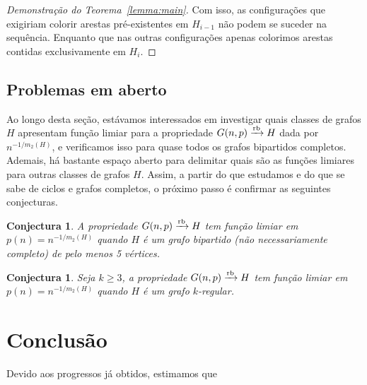 \documentclass[11pt,twoside,a4paper]{book}
\newcommand{\K}{K_{\ell,r}} %
\def\rbarrow{\xrightarrow[]{\raisebox{0.0mm}[0mm]{$\scriptstyle \rm rb$}}}
\newtheorem{conjectura}[teorema] {Conjectura}
\theoremstyle{note}
\begin{document}
\begin{proof}[Demonstração do Teorema~\ref{lemma:main}]
 
        Com isso, as configurações que exigiriam colorir arestas pré-existentes em $H_{i-1}$ não podem se suceder na sequência.
        Enquanto que nas outras configurações apenas colorimos arestas contidas exclusivamente em $H_{i}$.
     \end{proof}
 
  
  
\subsection{Problemas em aberto}
\label{subsec:bipartido-prob}
Ao longo desta seção, estávamos interessados em investigar quais classes de grafos $H$ apresentam função limiar para a propriedade $G(n,p)\rbarrow H$  dada por $n^{-1/m_2(H)}$, 
e verificamos isso para quase todos os grafos bipartidos completos.
Ademais, há bastante espaço aberto para delimitar quais são as funções limiares para outras classes de grafos $H$. 
Assim, a partir do que estudamos e do que se sabe de ciclos e grafos completos, o próximo passo é confirmar as seguintes conjecturas. %



\begin{conjectura}\label{conj:antibipartidos}
     A propriedade $G(n,p)\rbarrow H$ tem função limiar em  $p(n) =  n^{-1/m_2(H)}$ quando $H$ é um grafo bipartido (não necessariamente completo) de pelo menos 5 vértices.
\end{conjectura}

\begin{conjectura}\label{conj:antiregulares}
     Seja $k \geq 3$, a propriedade $G(n,p)\rbarrow H$ tem função limiar em  $p(n) =  n^{-1/m_2(H)}$ quando $H$ é um grafo $k$-regular.
\end{conjectura}

\section{Conclusão}
\label{sec:conclusao}

Devido aos progressos já obtidos, estimamos que 




\end{document}
